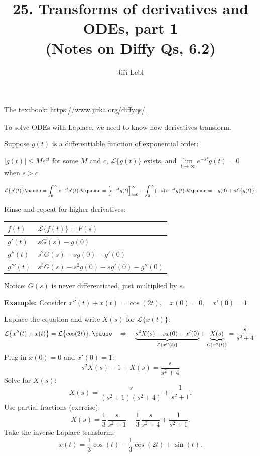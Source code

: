 \documentclass[10pt,aspectratio=169]{beamer}
\author{Ji\v{r}\'i Lebl}
\institute[OSU]{%
Oklahoma State University%
}
\title{25. Transforms of derivatives and ODEs, part 1\\(Notes on Diffy Qs, 6.2)}
\date{}
\begin{document}
\begin{frame}
\titlepage


\begin{center}
The textbook: \url{https://www.jirka.org/diffyqs/}
\end{center}
\end{frame}

\begin{frame}
To solve ODEs with Laplace, we need to know how derivatives transform.

\medskip
\pause

Suppose $g(t)$ is a differentiable function of exponential order:

\medskip
\pause

$\lvert g(t) \rvert \leq M e^{ct}$ for some
$M$ and $c$,
\qquad
$\mathcal{L} \bigl\{ g(t) \bigr\}$ exists,
\quad
and
\qquad
 $\lim\limits_{t\to\infty} e^{-st}g(t) = 0$ when $s > c$.

\pause
\[
\mathcal{L} \bigl\{ g'(t) \bigr\}
\pause
=
\int_0^\infty
e^{-st}
g'(t) \,dt
\pause
=
\Bigl[e^{-st} g(t) \Bigr]_{t=0}^\infty
-
\int_0^\infty
(-s)\,
e^{-st}
g(t) \,dt
\pause
=
-g(0) + s \mathcal{L} \bigl\{ g(t) \bigr\} .
\]
\pause

Rinse and repeat for higher derivatives:
\begin{center}
\begin{tabular}{@{}ll@{}}
\toprule
$f(t)$ & $\mathcal{L} \bigl\{ f(t) \bigr\} = F(s)$ \\
\midrule
$g'(t)$ & $sG(s)-g(0)$ \\[4pt]
$g''(t)$ & $s^2G(s)-sg(0)-g'(0)$ \\[4pt]
$g'''(t)$ & $s^3G(s)-s^2g(0)-sg'(0)-g''(0)$ \\[4pt]
\bottomrule
\end{tabular}
\end{center}
\pause
Notice: $G(s)$ is never differentiated, just multiplied by
$s$.

\end{frame}

\begin{frame}
\textbf{Example:}
Consider
\qquad
$x''(t) + x(t) = \cos (2t), \quad x(0) = 0, \quad x'(0) = 1$.

\medskip
\pause

Laplace the equation and write $X(s)$ for $\mathcal{L}\bigl\{x(t)\bigr\}$:
\[
\mathcal{L} \bigl\{ x''(t) + x(t) \bigr\}
= \mathcal{L} \bigl\{ \cos (2t) \bigr\} ,
\pause
\quad
\Rightarrow
\quad
\underbrace{s^2 X(s) -sx(0)-x'(0)}_{\mathcal{L}\{x''(t)\}}
+ \underbrace{X(s)}_{\mathcal{L}\{x''(t)\}}
= \frac{s}{s^2 + 4} .
\]
\pause
Plug in $x(0)=0$ and $x'(0)=1$:
\[
s^2 X(s) -1 + X(s) = \dfrac{s}{s^2 + 4}
\]
\pause
Solve for $X(s)$:
\[
X(s) = \frac{s}{(s^2+1)(s^2 + 4)} + \frac{1}{s^2+1} .
\]
\pause
Use partial fractions (exercise):
\[
X(s) =\frac{1}{3} \, \frac{s}{s^2+1} - 
\frac{1}{3}\, \frac{s}{s^2+4} + \frac{1}{s^2+1} .
\]
\pause
Take the inverse Laplace transform:
\[
x(t) =\frac{1}{3}  \cos (t) -
\frac{1}{3} \cos (2t) + \sin (t) .
\]
\end{frame}
\end{document}
